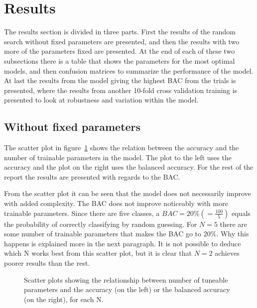\section{Results}

The results section is divided in three parts. First the results of the random search without fixed parameters are presented, and then the results with two more of the parameters fixed are presented. At the end of each of these two subsections there is a table that shows the parameters for the most optimal models, and then confusion matrices to summarize the performance of the model.  At last the results from the model giving the highest BAC from the trials is presented, where the results from another 10-fold cross validation training is presented to look at robustness and variation within the model.

\newpage
\subsection{Without fixed parameters}


The scatter plot in figure~\ref{fig:scatter} shows the relation between the accuracy and the number of trainable parameters in the model. The plot to the left uses the accuracy and the plot on the right uses the balanced accuracy. For the rest of the report the results are presented with regards to the BAC.  

From the scatter plot it can be seen that the model does not necessarily improve with added complexity. The BAC does not improve noticeably with more trainable parameters. Since there are five classes, a $BAC=20\%(=\frac{100}{5})$ equals the probability of correctly classifying by random guessing. For $N=5$ there are some number of trainable parameters that makes the BAC go to $20\%$. Why this happens is explained more in the next paragraph. It is not possible to deduce which N works best from this scatter plot, but it is clear that $N=2$ achieves poorer results than the rest.

\begin{figure}[H]
    \centering
    \begin{minipage}[b]{0.48\textwidth}
        
        \vspace{-0.5cm}
    \end{minipage}
    \begin{minipage}[b]{0.48\textwidth}
        
        \vspace{-0.5cm}
    \end{minipage}
    \captionsetup{width=0.95\linewidth}
    \caption{Scatter plots showing the relationship between number of tuneable parameters and the accuracy (on the left) or the balanced accuracy (on the right), for each N. }
    \label{fig:scatter}
\end{figure}

